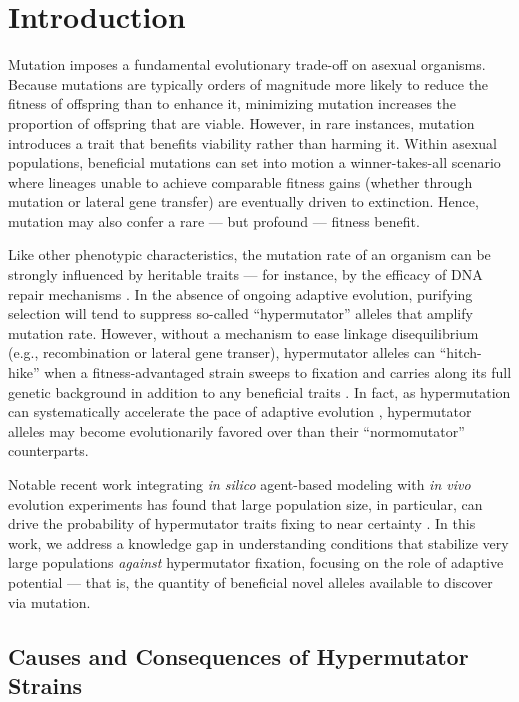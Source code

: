 \section{Introduction} \label{sec:introduction}

Mutation imposes a fundamental evolutionary trade-off on asexual organisms.
Because mutations are typically orders of magnitude more likely to reduce the fitness of offspring than to enhance it, minimizing mutation increases the proportion of offspring that are viable.
However, in rare instances, mutation introduces a trait that benefits viability rather than harming it.
Within asexual populations, beneficial mutations can set into motion a winner-takes-all scenario where lineages unable to achieve comparable fitness gains (whether through mutation or lateral gene transfer) are eventually driven to extinction.
Hence, mutation may also confer a rare --- but profound --- fitness benefit.

Like other phenotypic characteristics, the mutation rate of an organism can be strongly influenced by heritable traits --- for instance, by the efficacy of DNA repair mechanisms \citep{sniegowski2000evolution}.
In the absence of ongoing adaptive evolution, purifying selection will tend to suppress so-called ``hypermutator'' alleles that amplify mutation rate.
However, without a mechanism to ease linkage disequilibrium (e.g., recombination or lateral gene transer), hypermutator alleles can  ``hitch-hike'' when a fitness-advantaged strain sweeps to fixation and carries along its full genetic background in addition to any beneficial traits \citep{chao1983competition,johnson1999beneficial,gentile2011competition}.
In fact, as hypermutation can systematically accelerate the pace of adaptive evolution \citep{orr2000rate}, hypermutator alleles may become evolutionarily favored over than their ``normomutator'' counterparts.

Notable recent work integrating \textit{in silico} agent-based modeling with \textit{in vivo} evolution experiments has found that large population size, in particular, can drive the probability of hypermutator traits fixing to near certainty \citep{raynes2018sign}.
In this work, we address a knowledge gap in understanding conditions that stabilize very large populations \textit{against} hypermutator fixation, focusing on the role of adaptive potential --- that is, the quantity of beneficial novel alleles available to discover via mutation.

\subsection{Causes and Consequences of Hypermutator Strains}

